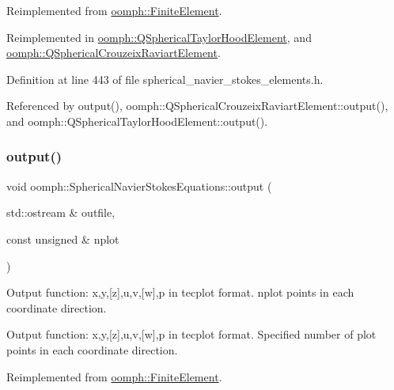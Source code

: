 Reimplemented from \hyperlink{classoomph_1_1FiniteElement_a2ad98a3d2ef4999f1bef62c0ff13f2a7}{oomph\+::\+Finite\+Element}.



Reimplemented in \hyperlink{classoomph_1_1QSphericalTaylorHoodElement_af3864809dfd77246f0ec052480ac397f}{oomph\+::\+Q\+Spherical\+Taylor\+Hood\+Element}, and \hyperlink{classoomph_1_1QSphericalCrouzeixRaviartElement_a2e829acc8cb74c743a661b63fb1aa618}{oomph\+::\+Q\+Spherical\+Crouzeix\+Raviart\+Element}.



Definition at line 443 of file spherical\+\_\+navier\+\_\+stokes\+\_\+elements.\+h.



Referenced by output(), oomph\+::\+Q\+Spherical\+Crouzeix\+Raviart\+Element\+::output(), and oomph\+::\+Q\+Spherical\+Taylor\+Hood\+Element\+::output().

\mbox{\label{classoomph_1_1SphericalNavierStokesEquations_a5506adeb5ecb11e16254b5ee48049c5d}} 
\subsubsection{\texorpdfstring{output()}{output()}\hspace{0.1cm}{\footnotesize\ttfamily [2/4]}}
{\footnotesize\ttfamily void oomph\+::\+Spherical\+Navier\+Stokes\+Equations\+::output (\begin{DoxyParamCaption}\item[{std\+::ostream \&}]{outfile,  }\item[{const unsigned \&}]{nplot }\end{DoxyParamCaption})\hspace{0.3cm}{\ttfamily [virtual]}}



Output function\+: x,y,\mbox{[}z\mbox{]},u,v,\mbox{[}w\mbox{]},p in tecplot format. nplot points in each coordinate direction. 

Output function\+: x,y,\mbox{[}z\mbox{]},u,v,\mbox{[}w\mbox{]},p in tecplot format. Specified number of plot points in each coordinate direction. 

Reimplemented from \hyperlink{classoomph_1_1FiniteElement_afa9d9b2670f999b43e6679c9dd28c457}{oomph\+::\+Finite\+Element}.



